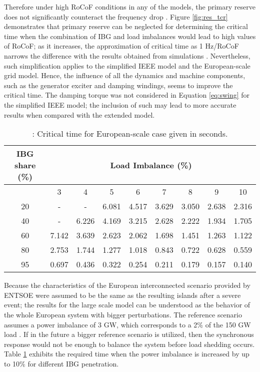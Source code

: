 Therefore under high RoCoF conditions in any of the models, the primary reserve does not significantly counteract the frequency drop \cite{dena2014}. Figure \ref{fig:res_tcr} demonstrates that primary reserve can be neglected for determining the critical time when the combination of IBG and load imbalances would lead to high values of RoCoF; as it increases, the approximation of critical time as 1 Hz/RoCoF narrows the difference with the results obtained from simulations \cite{miller2017technology}. Nevertheless, such simplification applies to the simplified IEEE model and the European-scale grid model. Hence, the influence of all the dynamics and machine components, such as the generator exciter and damping windings, seems to improve the critical time. The damping torque was not considered in Equation \eqref{eq:swing} for the simplified IEEE model; the inclusion of such may lead to more accurate results when compared with the extended model.
\begin{table}[h]
	\caption{\label{tb:crtime}: Critical time for European-scale case given in seconds.}
	\centering
	\begin{tabular}{*9c}
		\toprule
		\textbf{IBG share (\%)}    & \multicolumn{8}{c}{\textbf{Load Imbalance (\%)}} \\
		\midrule
		{} & 3&    4&    5&    6&    7&    8&    9    &10 \\
		\midrule
		20&    -    &    -    &    6.081&    4.517&    3.629&    3.050&    2.638&    2.316\\
		40&    -    &    6.226&    4.169&    3.215&    2.628&    2.222&    1.934&    1.705\\
		60&7.142 &    3.639&    2.623&    2.062&    1.698&    1.451&    1.263&    1.122\\
		80&    2.753&    1.744&    1.277&    1.018&    0.843&    0.722&    0.628&    0.559\\
		
		95&    0.697&    0.436&    0.322&    0.254&    0.211&    0.179&    0.157&    0.140\\
		\bottomrule
	\end{tabular}
\end{table}


Because the characteristics of the  European interconnected scenario provided by ENTSOE were assumed to be the same as the resulting islands after a severe event; the results for the large scale model can be understood as the behavior of the whole European system with bigger perturbations. The reference scenario assumes a power imbalance of 3 GW, which corresponds to a 2\% of the 150 GW load \cite{ENTSOE.2016}. If in the future a bigger reference scenario is utilized, then the synchronous response would not be enough to balance the system before load shedding occurs. Table \ref{tb:crtime} exhibits the required time when the power imbalance is increased by up to 10\% for different IBG penetration.



